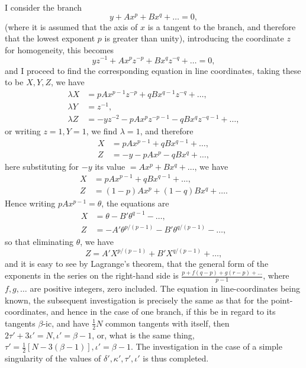 \documentclass[11pt]{article}
\begin{document}
I consider the branch
\[ y + A x^p + B x^q + \ldots = 0, \]
(where it is assumed that the axis of $x$ is a tangent to the branch, and therefore that the lowest exponent $p$ is greater than unity), introducing the coordinate $z$ for homogeneity, this becomes
\[ y z^{-1} + A x^p z^{-p} + B x^q z^{-q} + \ldots = 0, \]
and I proceed to find the corresponding equation in line coordinates, taking these to be $X, Y, Z$, we have
\begin{align*}
\lambda X &= p A x^{p-1} z^{-p} + q B x^{q-1} z^{-q} + \ldots,\\
\lambda Y &= z^{-1},\\
\lambda Z &= -y z^{-2} - p A x^p z^{-p-1} - q B x^q z^{-q-1} + \ldots,
\end{align*}
or writing $z = 1, Y = 1$, we find $\lambda = 1$, and therefore
\begin{align*}
X &= p A x^{p-1} + q B x^{q-1} + \ldots,\\
Z &= -y - p A x^p - q B x^q + \ldots,
\end{align*}
here substituting for $-y$ its value $= A x^p + B x^q + \ldots$, we have
\begin{align*}
X &= p A x^{p-1} + q B x^{q-1} + \ldots,\\
Z &= (1 - p) A x^p + (1 - q) B x^q + \ldots.
\end{align*}
Hence writing $p A x^{p-1} = \theta$, the equations are
\begin{align*}
X &= \theta - B'\theta^{q-1} - \ldots,\\
Z &= -A' \theta^{p/(p-1)} - B' \theta^{q/(p-1)} - \ldots,
\end{align*}
so that eliminating $\theta$, we have
\[ Z = A' X^{p/(p-1)} + B' X^{q/(p-1)} + \ldots, \]
and it is easy to see by Lagrange's theorem, that the general form of the exponents in the series on the right-hand side is $\tfrac{p + f(q - p) + g(r - p) + \ldots}{p - 1}$, where $f, g, \ldots$ are positive integers, zero included. The equation in line-coordinates being known, the subsequent investigation is precisely the same as that for the point-coordinates, and hence in the case of one branch, if this be in regard to its tangents $\beta$-ic, and have $\tfrac{1}{2}N$ common tangents with itself, then $2\tau' + 3\iota' = N, \iota' = \beta - 1$, or, what is the same thing, $\tau' = \tfrac{1}{2}[N - 3(\beta - 1)], \iota' = \beta - 1$. The investigation in the case of a simple singularity of the values of $\delta', \kappa', \tau', \iota'$ is thus completed.

\bigskip
\end{document}
